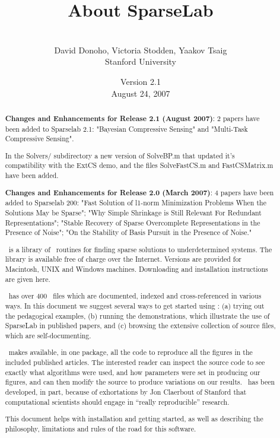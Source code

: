 \documentclass{article}
\begin{document}


\title{About SparseLab}
\author{
\bigskip \\
David Donoho, Victoria Stodden, Yaakov Tsaig\\
Stanford University}
\date{Version 2.1\\
August 24, 2007}

\maketitle

\begin{abstract}
{\bf Changes and Enhancements for Release 2.1 (August 2007)}: 2 papers have been added to Sparselab 2.1: "Bayesian 
Compressive 
Sensing" and "Multi-Task Compressive Sensing".

In the Solvers/ subdirectory a new version of SolveBP.m that updated it's compatibility with the ExtCS demo, and the 
files SolveFastCS.m and FastCSMatrix.m have been added.


{\bf Changes and Enhancements for Release 2.0 (March 2007)}: 4 papers have been added to Sparselab 200: "Fast
Solution of l1-norm Minimization Problems When the Solutions May be Sparse"; "Why Simple Shrinkage
is Still Relevant For Redundant Representations"; "Stable Recovery of Sparse Overcomplete
Representations in the Presence of Noise"; "On the Stability of Basis Pursuit in the Presence of
Noise."

\WaveLab\ is a library of \Matlab\ routines for finding sparse solutions to underdetermined
systems. The library is available free of charge over the Internet. Versions are provided for
Macintosh, UNIX and Windows machines. Downloading and installation instructions are given here.

\WaveLab\ has over 400 \dotm\ files which are documented, indexed and cross-referenced in various
ways.  In this document we suggest several ways to get started using \WaveLab: (a) trying out the
pedagogical examples, (b) running the demonstrations, which illustrate the use of SparseLab in
published papers, and (c) browsing the extensive collection of source files, which are
self-documenting.

\WaveLab\ makes available, in one package, all the code to reproduce all the figures in the
included published articles. The interested reader can inspect the source code to see exactly what
algorithms were used, and how parameters were set in producing our figures, and can then modify the
source to produce variations on our results. \WaveLab\ has been developed, in part, because of
exhortations by Jon Claerbout of Stanford that computational scientists should engage in ``really
reproducible'' research.

This document helps with installation and getting started, as well as describing the philosophy,
limitations and rules of the road for this software.
\end{abstract}
\end{document}
